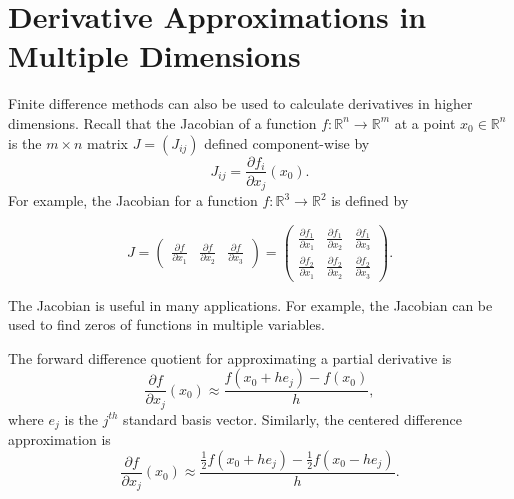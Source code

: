 \section*{Derivative Approximations in Multiple Dimensions} %

Finite difference methods can also be used to calculate derivatives in higher dimensions.
Recall that the Jacobian of a function $f:\mathbb{R}^n \rightarrow \mathbb{R}^m$ at a point $x_0 \in \mathbb{R}^n$ is the $m \times n$ matrix $J = (J_{ij})$ defined component-wise by
\begin{equation*}
J_{ij} = \frac{\partial f_i}{\partial x_j}(x_0).
\end{equation*}
For example, the Jacobian for a function $f:\mathbb{R}^3 \rightarrow \mathbb{R}^2$ is defined by

\[
J = \begin{pmatrix}
\frac{\partial f}{\partial x_1}&\frac{\partial f}{\partial x_2}&\frac{\partial f}{\partial x_3}
\end{pmatrix}
= \begin{pmatrix}
\frac{\partial f_1}{\partial x_1}&\frac{\partial f_1}{\partial x_2}&\frac{\partial f_1}{\partial x_3}\\
\frac{\partial f_2}{\partial x_1}&\frac{\partial f_2}{\partial x_2}&\frac{\partial f_2}{\partial x_3}
\end{pmatrix}.
\]

The Jacobian is useful in many applications.  For example, the Jacobian can be used to find zeros of functions in multiple variables.

The forward difference quotient for approximating a partial derivative is
\begin{equation*}
\frac{\partial f}{\partial x_j} (x_0) \approx \frac{f(x_0+h e_j)-f(x_0)}{h},
\end{equation*}
where $e_j$ is the $j^{th}$ standard basis vector.
Similarly, the centered difference approximation is
\begin{equation*}
\frac{\partial f}{\partial x_j} (x_0) \approx \frac{\frac{1}{2}f(x_0+h e_j)-\frac{1}{2}f(x_0-h e_j)}{h}.
\end{equation*}

